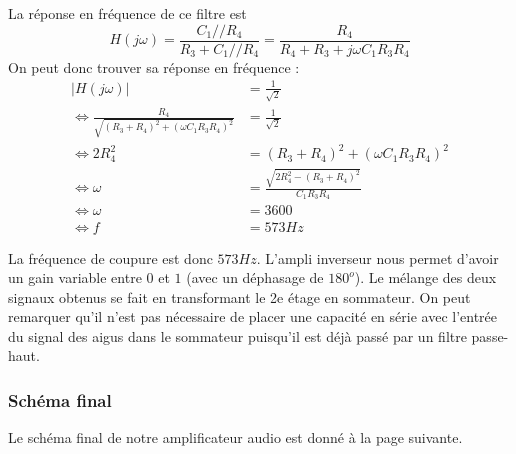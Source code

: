 \documentclass{../template/labo}
\begin{document}
La réponse en fréquence de ce filtre est $$H(j\omega) = \frac{C_1 // R_4}{R_3 + C_1 // R_4} = \frac{R_4}{R_4 + R_3 + j\omega C_1 R_3 R_4}$$
On peut donc trouver sa réponse en fréquence : 
\begin{align*}
	|H(j\omega)| &= \frac{1}{\sqrt{2}} \\
	\Leftrightarrow \frac{R_4}{\sqrt{(R_3 + R_4)^2 + (\omega C_1 R_3 R_4)^2}} &= \frac{1}{\sqrt{2}} \\
	\Leftrightarrow 2 R_4^2 &= (R_3 + R_4)^2 + (\omega C_1 R_3 R_4)^2 \\
	\Leftrightarrow \omega &= \frac{\sqrt{2 R_4^2 - (R_3 + R_4)^2}}{C_1 R_3 R_4} \\
	\Leftrightarrow \omega &= 3600 \\
	\Leftrightarrow f &= 573 Hz
\end{align*}


La fréquence de coupure est donc $573 Hz$.
L'ampli inverseur nous permet d'avoir un gain variable entre $0$ et $1$ (avec un déphasage de $180^{o}$).
Le mélange des deux signaux obtenus se fait en transformant le 2e étage en sommateur. On peut remarquer qu'il n'est pas nécessaire de placer une capacité en série avec l'entrée du signal des aigus dans le sommateur puisqu'il est déjà passé par un filtre passe-haut.

\subsubsection{Schéma final}
Le schéma final de notre amplificateur audio est donné à la page suivante.
\end{document}

